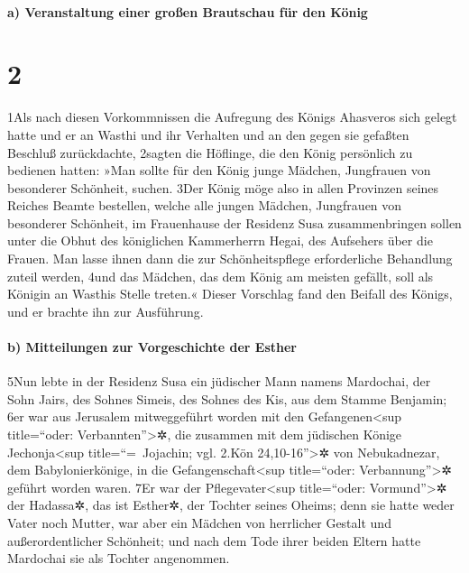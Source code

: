 \hypertarget{a-veranstaltung-einer-grouxdfen-brautschau-fuxfcr-den-kuxf6nig}{%
\paragraph{a) Veranstaltung einer großen Brautschau für den
König}\label{a-veranstaltung-einer-grouxdfen-brautschau-fuxfcr-den-kuxf6nig}}

\hypertarget{section-1}{%
\section{2}\label{section-1}}

1Als nach diesen Vorkommnissen die Aufregung des Königs Ahasveros sich
gelegt hatte und er an Wasthi und ihr Verhalten und an den gegen sie
gefaßten Beschluß zurückdachte, 2sagten die Höflinge, die den König
persönlich zu bedienen hatten: »Man sollte für den König junge Mädchen,
Jungfrauen von besonderer Schönheit, suchen. 3Der König möge also in
allen Provinzen seines Reiches Beamte bestellen, welche alle jungen
Mädchen, Jungfrauen von besonderer Schönheit, im Frauenhause der
Residenz Susa zusammenbringen sollen unter die Obhut des königlichen
Kammerherrn Hegai, des Aufsehers über die Frauen. Man lasse ihnen dann
die zur Schönheitspflege erforderliche Behandlung zuteil werden, 4und
das Mädchen, das dem König am meisten gefällt, soll als Königin an
Wasthis Stelle treten.« Dieser Vorschlag fand den Beifall des Königs,
und er brachte ihn zur Ausführung.

\hypertarget{b-mitteilungen-zur-vorgeschichte-der-esther}{%
\paragraph{b) Mitteilungen zur Vorgeschichte der
Esther}\label{b-mitteilungen-zur-vorgeschichte-der-esther}}

5Nun lebte in der Residenz Susa ein jüdischer Mann namens Mardochai, der
Sohn Jairs, des Sohnes Simeis, des Sohnes des Kis, aus dem Stamme
Benjamin; 6er war aus Jerusalem mitweggeführt worden mit den
Gefangenen\textless sup title=``oder: Verbannten''\textgreater✲, die
zusammen mit dem jüdischen Könige Jechonja\textless sup
title=``=~Jojachin; vgl. 2.Kön 24,10-16''\textgreater✲ von Nebukadnezar,
dem Babylonierkönige, in die Gefangenschaft\textless sup title=``oder:
Verbannung''\textgreater✲ geführt worden waren. 7Er war der
Pflegevater\textless sup title=``oder: Vormund''\textgreater✲ der
Hadassa✲, das ist Esther✲, der Tochter seines Oheims; denn sie hatte
weder Vater noch Mutter, war aber ein Mädchen von herrlicher Gestalt und
außerordentlicher Schönheit; und nach dem Tode ihrer beiden Eltern hatte
Mardochai sie als Tochter angenommen.

